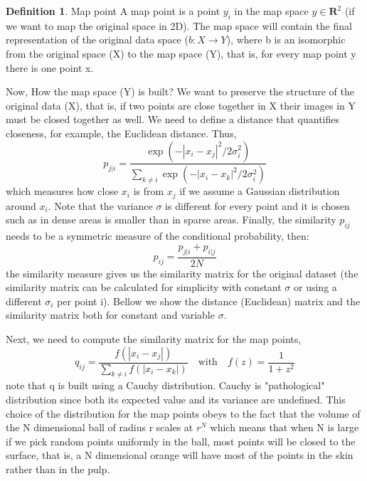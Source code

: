 \documentclass[11pt]{article}
\theoremstyle{definition}
\newtheorem{definition}{Definition}[section]
\theoremstyle{remark}
\begin{document}
\begin{definition}{Map point}
A map point is a point $y_i$ in the map space $y \in \mathbf{R}^2$ (if we want to map the original space in 2D). The map space will contain the final representation of the original data space ($b:X \to Y$), where b is an isomorphic from the original space (X) to the map space (Y), that is, for every map point y there is one point x. 
\end{definition}
 
Now, How the map space (Y) is built? We want to preserve the structure of the original data (X), that is, if two points are close together in X their images in Y must be closed together as well. We need to define a distance that quantifies closeness, for example, the Euclidean distance. Thus, 
\begin{equation} \label{eq:tsne}
p_{j|i} = \frac{\exp\left(-\left| x_i - x_j\right|^2 \big/ 2\sigma_i^2\right)}{\displaystyle\sum_{k \neq i} \exp\left(-\left| x_i - x_k\right|^2 \big/ 2\sigma_i^2\right)}
\end{equation}
which measures how close $x_i$ is from $x_j$ if we assume a Gaussian distribution around $x_i$. Note that the variance $\sigma$ is different for every point and it is chosen such as in dense areas is smaller than in sparse areas. 
Finally, the similarity $p_{ij}$ needs to be a symmetric measure of the conditional probability, then:
\begin{equation} \label{eq:tsne2}
p_{ij} = \frac{p_{j|i} + p_{i|j}}{2N}
\end{equation}
the similarity measure gives us the similarity matrix for the original dataset (the similarity matrix can be calculated for simplicity with constant $\sigma$ or using a different $\sigma_i$ per point i).
Bellow we show the distance (Euclidean) matrix and the similarity matrix both for constant and variable $\sigma$.

Next, we need to compute the similarity matrix for the map points,
\begin{equation}
q_{ij} = \frac{f(\left| x_i - x_j\right|)}{\displaystyle\sum_{k \neq i} f(\left| x_i - x_k\right|)} \quad \textrm{with} \quad f(z) = \frac{1}{1+z^2}
\end{equation}
note that q is built using a Cauchy distribution. Cauchy is "pathological" distribution since both its expected value and its variance are undefined. This choice of the distribution for the map points obeys to the fact that the volume of the N dimensional ball of radius r scales at $r^N$ which means that when N is large if we pick random points uniformly in the ball, most points will be closed to the surface, that is, a N dimensional orange will have most of the points in the skin rather than in the pulp.
\end{document}
